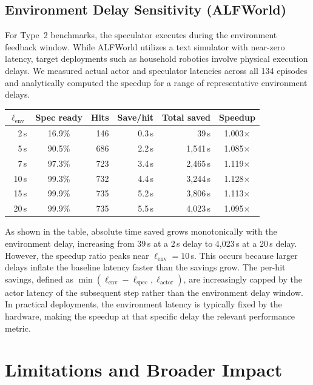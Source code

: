 \documentclass{article}
\begin{document}
\subsection{Environment Delay Sensitivity (ALFWorld)}
\label{app:env_delay}

For Type~2 benchmarks, the speculator executes during the environment feedback window. While ALFWorld utilizes a text simulator with near-zero latency, target deployments such as household robotics involve physical execution delays. We measured actual actor and speculator latencies across all 134 episodes and analytically computed the speedup for a range of representative environment delays.

\begin{center}
\small
\setlength{\tabcolsep}{8pt}
\begin{tabular}{r c r r r c}
\toprule
$\ell_{\mathrm{env}}$ & Spec ready & Hits & Save/hit & Total saved & Speedup \\
\midrule
2\,s  & 16.9\% & 146 & 0.3\,s & 39\,s    & 1.003$\times$ \\
5\,s  & 90.5\% & 686 & 2.2\,s & 1,541\,s & 1.085$\times$ \\
7\,s  & 97.3\% & 723 & 3.4\,s & 2,465\,s & 1.119$\times$ \\
10\,s & 99.3\% & 732 & 4.4\,s & 3,244\,s & 1.128$\times$ \\
15\,s & 99.9\% & 735 & 5.2\,s & 3,806\,s & 1.113$\times$ \\
20\,s & 99.9\% & 735 & 5.5\,s & 4,023\,s & 1.095$\times$ \\
\bottomrule
\end{tabular}
\end{center}

As shown in the table, absolute time saved grows monotonically with the environment delay, increasing from 39\,s at a 2\,s delay to 4,023\,s at a 20\,s delay. However, the speedup ratio peaks near $\ell_{\mathrm{env}} = 10$\,s. This occurs because larger delays inflate the baseline latency faster than the savings grow. The per-hit savings, defined as $\min(\ell_{\mathrm{env}} - \ell_{\mathrm{spec}}, \ell_{\mathrm{actor}})$, are increasingly capped by the actor latency of the subsequent step rather than the environment delay window. In practical deployments, the environment latency is typically fixed by the hardware, making the speedup at that specific delay the relevant performance metric.


\section{Limitations and Broader Impact}
\label{app:limitations}
\end{document}
